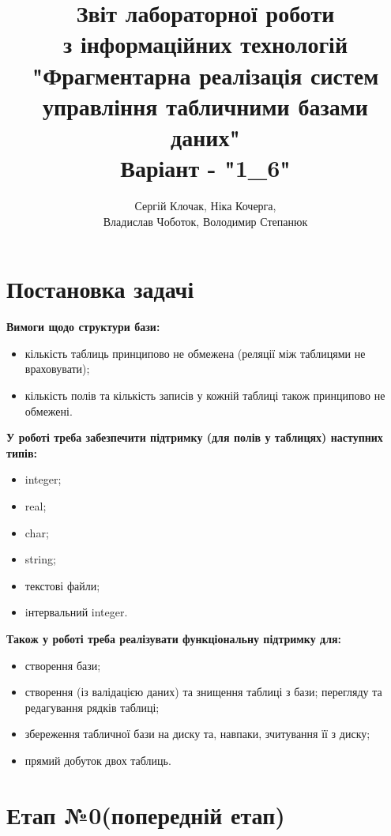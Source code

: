 \documentclass[a4paper, 12pt]{article}
\author{Сергій Клочак, Ніка Кочерга, \\
        Владислав Чоботок, Володимир Степанюк}
\title{Звіт лабораторної роботи\\
       з інформаційних технологій\\
       "Фрагментарна реалізація систем управління табличними базами даних"\\
       Варіант - "1\_6"}
\begin{document}
\maketitle

\newpage

\tableofcontents

\newpage

\section{Постановка задачі}

\textbf{Вимоги щодо структури бази:}

\begin{itemize}
\item кількість таблиць принципово не обмежена (реляції між таблицями не враховувати);
\item кількість полів та кількість записів у кожній таблиці також принципово не обмежені.
\end{itemize}


\textbf{У роботі треба забезпечити підтримку (для полів у таблицях) наступних типів:}

\begin{itemize}
\item integer;
\item real;
\item char;
\item string;
\item текстові файли;
\item iнтервальний integer.
\end{itemize}

\textbf{Також у роботі треба реалізувати функціональну підтримку для:}

\begin{itemize}
\item створення бази;
\item створення (із валідацією даних) та знищення таблиці з бази;
перегляду та редагування рядків таблиці;
\item збереження табличної бази на диску та, навпаки, зчитування її з диску;
\item прямий добуток двох таблиць.
\end{itemize}

\section{Етап №0(попередній етап)}
\end{document}
